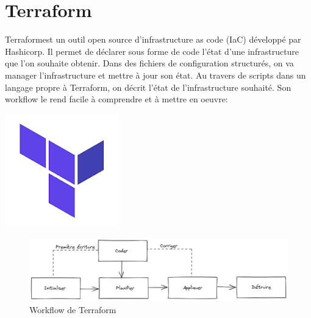 \documentclass[12pt, a4paper, twoside]{article}
\begin{document}
\section{Terraform}
\noindent%
\begin{minipage}{.7\textwidth}%
\gls{Terraform}est un outil open source d'infrastructure as code (\gls{IaC}) développé par Hashicorp. 
Il permet de déclarer sous forme de code l'état d'une infrastructure que l'on souhaite obtenir. 
Dans des fichiers de configuration structurés, on va manager l'infrastructure et mettre à jour son état.
Au travers de scripts dans un langage propre à \gls{Terraform}, on décrit l'état de l'infrastructure souhaité. 
Son workflow le rend facile à comprendre et à mettre en oeuvre: 
\end{minipage}%
\hfill
\begin{minipage}{.3\textwidth}%
\begin{center}
\includegraphics[scale=0.5]{src/logo_terraform.png}
\end{center}
\end{minipage}%

\begin{figure}[!ht]
    \centering
    \includegraphics[width=\textwidth]{src/graph_terraform.png}
    \caption{Workflow de \gls{Terraform}}
    \label{fig:graph_terraform.png}
\end{figure}
\end{document}

